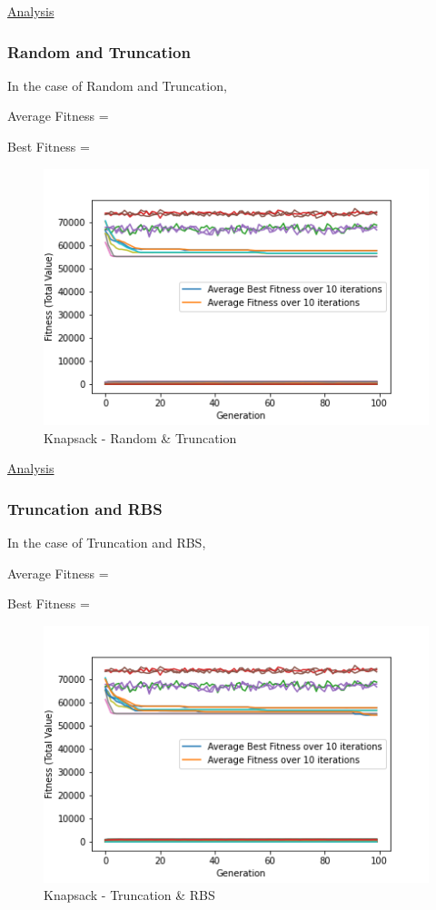 \documentclass[11pt, letterpaper]{article}
\begin{document}
\underline{Analysis}
\subsubsection {Random and Truncation}
In the case of Random and Truncation,

Average Fitness = 

Best Fitness = 
\begin{figure}[H]
    \centering
    \includegraphics[scale = 0.6]{images/knapsack_rd_tr.png}
    \caption {Knapsack - Random \& Truncation}
    \label {fig:kpRT}
\end{figure}

\underline{Analysis}
\subsubsection {Truncation and RBS}
In the case of Truncation and RBS,

Average Fitness = 

Best Fitness = 
\begin{figure}[H]
    \centering
    \includegraphics[scale = 0.6]{images/knapsack_tr_rb.png}
    \caption {Knapsack - Truncation \& RBS}
    \label {fig:kpTR}
\end{figure}
\end{document}
